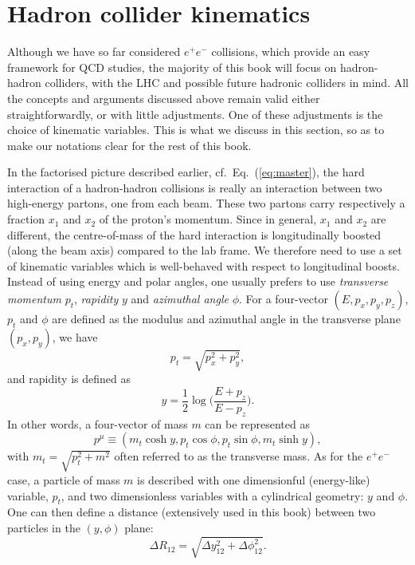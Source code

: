 \section{Hadron collider kinematics}\label{sec:hadron-collider-kinematics}

Although we have so far considered $e^+e^-$ collisions, which provide
an easy framework for QCD studies, the majority of this book will
focus on hadron-hadron colliders, with the LHC and possible future
hadronic colliders in mind.
%
All the concepts and arguments discussed above remain valid either
straightforwardly, or with little adjustments.
%
One of these adjustments is the choice of kinematic variables.
%
This is what we discuss in this section, so as to make our notations
clear for the rest of this book.

In the factorised picture described earlier,
cf.~Eq.~(\ref{eq:master}), the hard interaction of a hadron-hadron
collisions is really an interaction between two high-energy partons,
one from each beam.
%
These two partons carry respectively a fraction $x_1$ and $x_2$ of the
proton's momentum. Since in general, $x_1$ and $x_2$ are different,
the centre-of-mass of the hard interaction is longitudinally boosted
(along the beam axis) compared to the lab frame.  
%
We therefore need to use a set of kinematic variables which is
well-behaved with respect to longitudinal boosts.
%
Instead of using energy and polar angles, one usually prefers to use
{\em transverse momentum} $p_t$, {\em rapidity} $y$ and {\em azimuthal
  angle} $\phi$.
%
For a four-vector $(E,p_x,p_y,p_z)$, $p_t$ and $\phi$ are defined as the
modulus and azimuthal angle in the transverse plane $(p_x,p_y)$, \ie
we have
\begin{equation}
  p_t = \sqrt{p_x^2+p_y^2},
\end{equation}
and rapidity is defined as
\begin{equation}\label{eq:def-rapidity}
y = \frac{1}{2}\log\bigg(\frac{E+p_z}{E-p_z}\bigg).
\end{equation}
In other words, a four-vector of mass $m$ can be represented as
\begin{equation}
p^\mu\equiv (m_t\cosh y,p_t\cos\phi,p_t\sin\phi,m_t\sinh y),
\end{equation}
with $m_t=\sqrt{p_t^2+m^2}$ often referred to as the transverse
mass.
%
As for the $e^+e^-$ case, a particle of mass $m$ is described with
one dimensionful (energy-like) variable, $p_t$, and two dimensionless
variables with a cylindrical geometry: $y$ and $\phi$.
%
One can then define a distance (extensively used in this book) between two
particles in the $(y,\phi)$ plane:
\begin{equation}\label{eq:DeltaR-def}
\Delta R_{12} = \sqrt{\Delta y_{12}^2+\Delta\phi_{12}^2}.
\end{equation}

